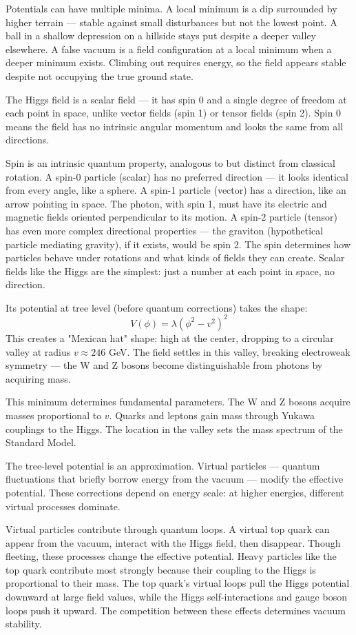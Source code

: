 Potentials can have multiple minima. A local minimum is a dip surrounded by higher terrain — stable against small disturbances but not the lowest point. A ball in a shallow depression on a hillside stays put despite a deeper valley elsewhere. A false vacuum is a field configuration at a local minimum when a deeper minimum exists. Climbing out requires energy, so the field appears stable despite not occupying the true ground state.

The Higgs field is a scalar field — it has spin 0 and a single degree of freedom at each point in space, unlike vector fields (spin 1) or tensor fields (spin 2). Spin 0 means the field has no intrinsic angular momentum and looks the same from all directions.

Spin is an intrinsic quantum property, analogous to but distinct from classical rotation. A spin-0 particle (scalar) has no preferred direction — it looks identical from every angle, like a sphere. A spin-1 particle (vector) has a direction, like an arrow pointing in space. The photon, with spin 1, must have its electric and magnetic fields oriented perpendicular to its motion. A spin-2 particle (tensor) has even more complex directional properties — the graviton (hypothetical particle mediating gravity), if it exists, would be spin 2. The spin determines how particles behave under rotations and what kinds of fields they can create. Scalar fields like the Higgs are the simplest: just a number at each point in space, no direction.

Its potential at tree level (before quantum corrections) takes the shape:
\[
V(\phi) = \lambda(\phi^2 - v^2)^2
\]
This creates a "Mexican hat" shape: high at the center, dropping to a circular valley at radius $v \approx 246$ GeV. The field settles in this valley, breaking electroweak symmetry — the W and Z bosons become distinguishable from photons by acquiring mass.

This minimum determines fundamental parameters. The W and Z bosons acquire masses proportional to $v$. Quarks and leptons gain mass through Yukawa couplings to the Higgs. The location in the valley sets the mass spectrum of the Standard Model.

The tree-level potential is an approximation. Virtual particles — quantum fluctuations that briefly borrow energy from the vacuum — modify the effective potential. These corrections depend on energy scale: at higher energies, different virtual processes dominate.

Virtual particles contribute through quantum loops. A virtual top quark can appear from the vacuum, interact with the Higgs field, then disappear. Though fleeting, these processes change the effective potential. Heavy particles like the top quark contribute most strongly because their coupling to the Higgs is proportional to their mass. The top quark's virtual loops pull the Higgs potential downward at large field values, while the Higgs self-interactions and gauge boson loops push it upward. The competition between these effects determines vacuum stability.

